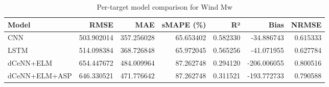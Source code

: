 \begin{table}
\caption{Per-target model comparison for Wind Mw}
\begin{tabular}{lrrrrrr}
\toprule
Model & RMSE & MAE & sMAPE (\%) & R² & Bias & NRMSE \\
\midrule
CNN & 503.902014 & 357.256028 & 65.653402 & 0.582330 & -34.886743 & 0.615333 \\
LSTM & 514.098384 & 368.726848 & 65.972045 & 0.565256 & -41.071955 & 0.627784 \\
dCeNN+ELM & 654.447672 & 484.009964 & 87.262748 & 0.294120 & -206.006055 & 0.800516 \\
dCeNN+ELM+ASP & 646.330521 & 471.776642 & 87.262748 & 0.311521 & -193.772733 & 0.790588 \\
\bottomrule
\end{tabular}
\end{table}
